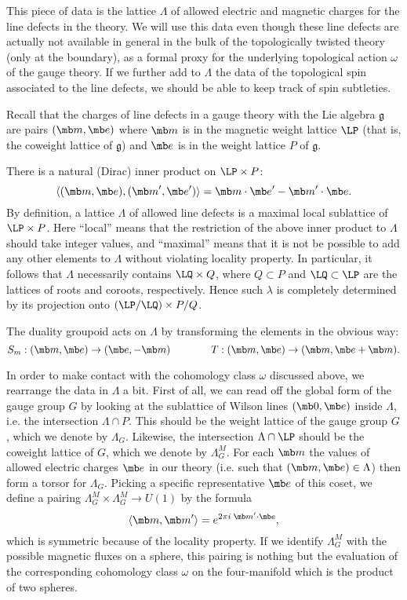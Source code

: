 \documentclass[11pt,reqno]{amsart}
\theoremstyle{plain}
\numberwithin{equation}{section}
\newcommand{\g}{\mathfrak{g}}
\theoremstyle{definition}
\begin{document}
This piece of data is the lattice $\Lambda$ of allowed electric and
magnetic charges for the line defects in the theory. We will use this
data even though these line defects are actually not available in
general in the bulk of the topologically twisted theory (only at the
boundary), as a formal proxy for the underlying topological action
$\omega$ of the gauge theory. If we further add to $\Lambda$ the data
of the topological spin associated to the line defects, we should be
able to keep track of spin subtleties.

Recall that the charges of line defects in a gauge theory with the Lie
algebra $\mathfrak{g}$ are pairs $({\mb m},{\mb e})$ where ${\mb m}$
is in the magnetic weight lattice $\LP$ (that is, the coweight lattice
of $\mathfrak{g}$) and ${\mb e}$ is in the weight lattice $P$ of $\g$.

There is a natural (Dirac) inner product on $\LP \times P$:
\begin{equation}
\langle ({\mb m},{\mb e}), ({\mb m}',{\mb e}') \rangle = {\mb m} \cdot
{\mb e}' - {\mb m}' \cdot {\mb e}.
\end{equation}
By definition, a lattice $\Lambda$ of allowed line defects is a
maximal local sublattice of $\LP \times P$. Here ``local'' means that
the restriction of the above inner product to $\Lambda$ should take
integer values, and ``maximal'' means that it is not be possible to
add any other elements to $\Lambda$ without violating locality
property. In particular, it follows that $\Lambda$ necessarily
contains $\LQ \times Q$, where $Q \subset P$ and $\LQ \subset \LP$ are
the lattices of roots and coroots, respectively. Hence such $\lambda$
is completely determined by its projection onto $(\LP/\LQ) \times
P/Q$.

The duality groupoid acts on $\Lambda$ by transforming the elements in
the obvious way:
\begin{equation}
  S_m: ({\mb m},{\mb e}) \to ({\mb e},-{\mb m}) \qquad \qquad T: ({\mb
    m},{\mb e}) \to ({\mb m},{\mb e} + {\mb m}).
\end{equation}

In order to make contact with the cohomology class $\omega$ discussed
above, we rearrange the data in $\Lambda$ a bit.  First of all, we can
read off the global form of the gauge group $G$ by looking at the
sublattice of Wilson lines $({\mb 0},{\mb e})$ inside $\Lambda$,
i.e. the intersection $\Lambda \cap P$. This should be the weight
lattice of the gauge group $G$, which we denote by
$\Lambda_G$. Likewise, the intersection $\Lambda \cap \LP$ should be
the coweight lattice of $G$, which we denote by $\Lambda^M_G$. For
each ${\mb m}$ the values of allowed electric charges ${\mb e}$ in our
theory (i.e. such that $({\mb m},{\mb e}) \in \Lambda$) then form a
torsor for $\Lambda_G$. Picking a specific representative ${\mb e}$ of
this coset, we define a pairing $\Lambda^M_G \times \Lambda^M_G \to
U(1)$ by the formula
$$
\langle {\mb m},{\mb m}' \rangle = e^{2\pi i \; {\mb m}' \cdot {\mb
    e}},
$$
which is symmetric because of the locality property. If we identify
$\Lambda^M_G$ with the possible magnetic fluxes on a sphere, this
pairing is nothing but the evaluation of the corresponding cohomology
class $\omega$ on the four-manifold which is the product of two
spheres.
\end{document}
